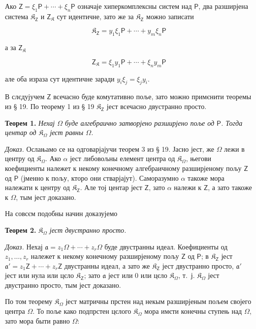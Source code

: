 \documentclass[11pt]{article}
\begin{document}
Ако \(\mathsf{Z}=\xi_1\mathsf P+\cdots+\xi_n\mathsf P\) означаје хиперкомплексны систем над \(\mathsf P\), два разширјена система \(\mathfrak K_{\mathsf{Z}}\) и \(\mathsf{Z}_{\mathfrak K}\) сут идентичне, зато же за \(\mathfrak K_{\mathsf{Z}}\) можно записати

\[
\mathfrak K_{\mathsf{Z}}=y_1\xi_1\mathsf P+\cdots+y_m\xi_n\mathsf P
\]

а за \(\mathsf{Z}_{\mathfrak K}\)

\[
\mathsf{Z}_{\mathfrak K}=\xi_1y_1\mathsf P+\cdots+\xi_ny_m\mathsf P
\]

але оба израза сут идентичне заради \(y_i\xi_j=\xi_jy_i\).

В слєдујучем \(\mathsf{Z}\) всечасно буде комутативно поље, зато можно примєнити теоремы из § 19. По теорему 1 из § 19 \(\mathfrak K_{\mathsf{Z}}\) јест всечасно двустранно просто.

\textbf{Теорем 1.} \emph{Нехај \(\Omega\) буде алгебраично затворјено разширјено поље од \(\mathsf P\). Тогда центар од \(\mathfrak K_\Omega\) јест равны \(\Omega\).}

\emph{Доказ.} Ослањамо се на одговарјајучи теорем 3 из § 19. Јасно јест, же \(\Omega\) лежи в центру од \(\mathfrak K_\Omega\). Ако \(\alpha\) јест либовољны елемент центра од \(\mathfrak K_\Omega\), његови коефициенты належет к некому конечному алгебраичному разширјеному пољу \(\mathsf{Z}\) од \(\mathsf P\) (јменно к пољу, кторо они стварјајут). Саморазумно \(\alpha\) такоже мора належати к центру од \(\mathfrak K_{\mathsf{Z}}\). Але тој центар јест \(\mathsf{Z}\), зато \(\alpha\) належи к \(\mathsf{Z}\), а зато такоже к \(\Omega\), тым јест доказано.

На совсєм подобны начин доказујемо

\textbf{Теорем 2.} \emph{\(\mathfrak K_\Omega\) јест двустранно просто.}

\emph{Доказ.} Нехај \(\mathfrak a=z_1\Omega+\cdots+z_r\Omega\) буде двустранны идеал. Коефициенты од \(z_1,\ldots,z_r\) належет к некому конечному разширјеному пољу \(\mathsf{Z}\) од \(\mathsf P\); в \(\mathfrak K_{\mathsf{Z}}\) јест \(\mathfrak a'=z_1\mathsf{Z}+\cdots+z_r\mathsf{Z}\) двустранны идеал, а зато же \(\mathfrak K_{\mathsf{Z}}\) јест двустранно просто, \(\mathfrak a'\) јест или нула или цєло \(\mathfrak K_{\mathsf{Z}}\); зато \(\mathfrak a\) јест или 0 или цєло \(\mathfrak K_\Omega\), т.~ј. \(\mathfrak K_\Omega\) јест двустранно просто, тым јест доказано.

По том теорему \(\mathfrak K_\Omega\) јест матричны прстен над некым разширјеным пољем својего центра \(\Omega\). То поље како подпрстен цєлого \(\mathfrak K_\Omega\) мора имєти конечны ступењ над \(\Omega\), зато мора быти равно \(\Omega\):
\end{document}
